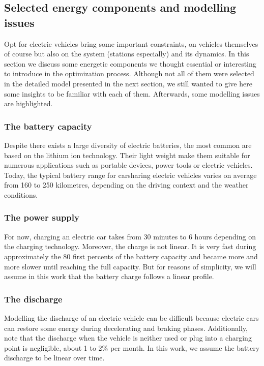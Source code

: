 \begin{bibunit}[ieeetr]
\subsection{Selected energy components and modelling issues}
Opt for electric vehicles bring some important constraints, on vehicles themselves of course but also on the system (stations especially) and its dynamics.
In this section we discuss some energetic components we thought essential or interesting to introduce in the optimization process.
Although not all of them were selected in the detailed model presented in the next section, we still wanted to give here some insights to be familiar with each of them.
Afterwards, some modelling issues are highlighted.

\subsubsection{The battery capacity}
Despite there exists a large diversity of electric batteries, the most common are based on the lithium ion technology.
Their light weight make them suitable for numerous applications such as portable devices, power tools or electric vehicles.
Today, the typical battery range for carsharing electric vehicles varies on average from 160 to 250 kilometres, depending on the driving context and the weather conditions.

\subsubsection{The power supply}
For now, charging an electric car takes from 30 minutes to 6 hours depending on the charging technology.
Moreover, the charge is not linear.
It is very fast during approximately the 80 first percents of the battery capacity and became more and more slower until reaching the full capacity.
But for reasons of simplicity, we will assume in this work that the battery charge follows a linear profile.


\subsubsection{The discharge}
Modelling the discharge of an electric vehicle can be difficult because electric cars can restore some energy during decelerating and braking phases.
Additionally, note that the discharge when the vehicle is neither used or plug into a charging point is negligible, about 1 to 2\% per month.
In this work, we assume the battery discharge to be linear over time.


\end{bibunit}
